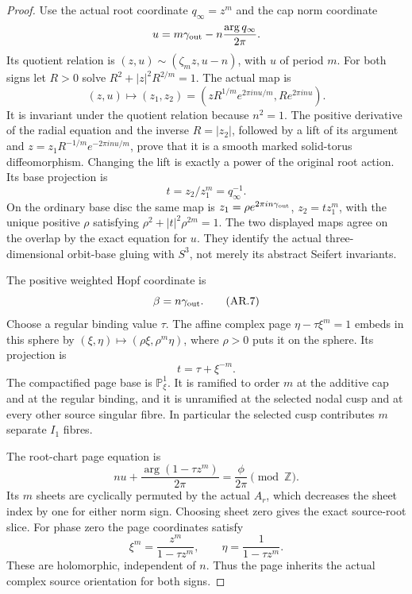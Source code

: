 \begin{proof}
Use the actual root coordinate \(q_\infty=z^m\) and the
cap norm coordinate
\[
 u=m\gamma_{\rm out}-n\frac{\arg q_\infty}{2\pi}.
\]
Its quotient relation is
\((z,u)\sim(\zeta_mz,u-n)\), with \(u\) of period \(m\).
For both signs let \(R>0\) solve
\(R^2+|z|^2R^{2/m}=1\). The actual map is
\[
 (z,u)\longmapsto(z_1,z_2)=
 \left(zR^{1/m}e^{2\pi i n u/m},R e^{2\pi i n u}\right).
                                                        \tag{AR.6}
\]
It is invariant under the quotient relation because \(n^2=1\).
The positive derivative of the radial equation and the inverse
\(R=|z_2|\), followed by a lift of its argument and
\(z=z_1R^{-1/m}e^{-2\pi inu/m}\), prove that it is a smooth
marked solid-torus diffeomorphism. Changing the lift is exactly
a power of the original root action. Its base projection is
\[
 t=z_2/z_1^m=q_\infty^{-1}.
\]
On the ordinary base disc the same map is
\(z_1=\rho e^{2\pi in\gamma_{\rm out}}\),
\(z_2=t z_1^m\), with the unique positive \(\rho\) satisfying
\(\rho^2+|t|^2\rho^{2m}=1\). The two displayed maps agree
on the overlap by the exact equation for \(u\). They identify
the actual three-dimensional orbit-base gluing with \(S^3\),
not merely its abstract Seifert invariants.

The positive weighted Hopf coordinate is
\[
                         \beta=n\gamma_{\rm out}.       \tag{AR.7}
\]
Choose a regular binding value \(\tau\). The affine complex
page \(\eta-\tau\xi^m=1\) embeds in this sphere by
\((\xi,\eta)\mapsto(\rho\xi,\rho^m\eta)\), where \(\rho>0\)
puts it on the sphere. Its projection is
\[
                         t=\tau+\xi^{-m}.                \tag{AR.8}
\]
The compactified page base is \(\mathbb P^1_\xi\). It is
ramified to order \(m\) at the additive cap and at the
regular binding, and it is unramified at the selected nodal
cusp and at every other source singular fibre. In particular
the selected cusp contributes \(m\) separate \(I_1\) fibres.

The root-chart page equation is
\[
 n u+\frac{\arg(1-\tau z^m)}{2\pi}=\frac\phi{2\pi}
                                  \pmod{\mathbb Z}.     \tag{AR.9}
\]
Its \(m\) sheets are cyclically permuted by the actual
\(A_r\), which decreases the sheet index by one for either
norm sign. Choosing sheet zero gives the exact source-root
slice. For phase zero the page coordinates satisfy
\[
 \xi^m=\frac{z^m}{1-\tau z^m},\qquad
 \eta=\frac1{1-\tau z^m}.                                 \tag{AR.10}
\]
These are holomorphic, independent of \(n\). Thus the page
inherits the actual complex source orientation for both signs.


\end{proof}
